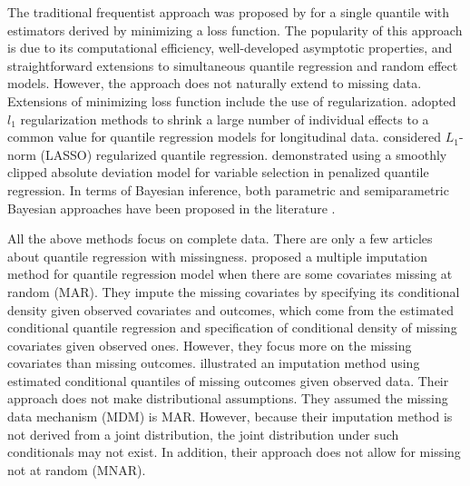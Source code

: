 \documentclass[useAMS,usenatbib,referee]{biom}
\newcommand{\polya}{P\'{o}lya} \newcommand{\yobs}{\bmath y_{\itl{obs}}}
\begin{document}
The traditional frequentist approach was proposed by
\citet{koenker1978} for a single quantile with estimators derived by
minimizing a loss function. The popularity of this approach is due to
its computational efficiency, well-developed asymptotic properties,
and straightforward extensions to simultaneous quantile regression and
random effect models. However, the approach does not naturally
extend to missing data.
Extensions of minimizing loss function include the use of regularization.
\citet{koenker2004} adopted $l_1$ regularization methods to shrink a large number of individual effects to a common value for quantile regression models for longitudinal data.
\citet{li2008} considered $L_1$-norm (LASSO) regularized quantile regression.
\citet{wu2009} demonstrated using a smoothly clipped absolute deviation model for variable selection in penalized quantile regression.
In terms of Bayesian inference, both parametric and semiparametric Bayesian approaches have been proposed in the literature \citep{yu2001,walker1999,hanson2002,reich2010}.


All the above methods focus on complete data.  There are only a few
articles about quantile regression with missingness.  \citet{wei2012}
proposed a multiple imputation method for quantile regression model
when there are some covariates missing at random (MAR). They impute
the missing covariates by specifying its conditional density given
observed covariates and outcomes, which come from the estimated
conditional quantile regression and specification of conditional
density of missing covariates given observed ones.
However, they focus more on the missing covariates than missing outcomes.
\citet{bottai2013} illustrated an imputation method using estimated
conditional quantiles of missing outcomes given observed data. Their
approach does not make distributional assumptions.  They assumed the
missing data mechanism (MDM) is MAR. However, because their
imputation method is not derived from a joint distribution, the joint
distribution under such conditionals may not exist.  In addition, their
approach does not allow for missing not at random (MNAR).
\end{document}
